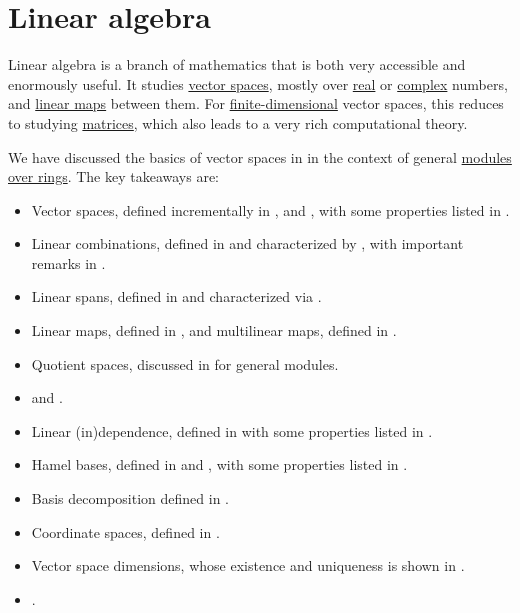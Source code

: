 \chapter{Linear algebra}\label{ch:linear_algebra}

Linear algebra is a branch of mathematics that is both very accessible and enormously useful. It studies \hyperref[def:vector_space]{vector spaces}, mostly over \hyperref[def:real_numbers]{real} or \hyperref[def:complex_numbers]{complex} numbers, and \hyperref[def:linear_function]{linear maps} between them. For \hyperref[thm:vector_space_dimension]{finite-dimensional} vector spaces, this reduces to studying \hyperref[def:array/matrix]{matrices}, which also leads to a very rich computational theory.

We have discussed the basics of vector spaces in  in the context of general \hyperref[def:module]{modules over rings}. The key takeaways are:
\begin{itemize}
  \item Vector spaces, defined incrementally in ,  and , with some properties listed in .
  \item Linear combinations, defined in  and characterized by , with important remarks in .
  \item Linear spans, defined in  and characterized via .
  \item Linear maps, defined in , and multilinear maps, defined in .
  \item Quotient spaces, discussed in  for general modules.
  \item {} and .
  \item Linear (in)dependence, defined in  with some properties listed in .
  \item Hamel bases, defined in  and , with some properties listed in .
  \item Basis decomposition defined in .
  \item Coordinate spaces, defined in .
  \item Vector space dimensions, whose existence and uniqueness is shown in .
  \item {}.
\end{itemize}
